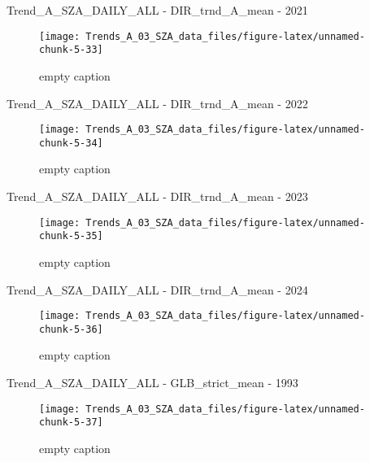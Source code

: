 \documentclass[
  10pt,
  a4paper,oneside]{article}
\begin{document}
Trend\_A\_SZA\_DAILY\_ALL - DIR\_trnd\_A\_mean - 2021

\begin{figure}[!ht]

{\centering \texttt{[image: Trends\_A\_03\_SZA\_data\_files/figure-latex/unnamed-chunk-5-33]} 

}

\caption{ empty caption }\label{fig:unnamed-chunk-5-33}
\end{figure}

Trend\_A\_SZA\_DAILY\_ALL - DIR\_trnd\_A\_mean - 2022

\begin{figure}[!ht]

{\centering \texttt{[image: Trends\_A\_03\_SZA\_data\_files/figure-latex/unnamed-chunk-5-34]} 

}

\caption{ empty caption }\label{fig:unnamed-chunk-5-34}
\end{figure}

Trend\_A\_SZA\_DAILY\_ALL - DIR\_trnd\_A\_mean - 2023

\begin{figure}[!ht]

{\centering \texttt{[image: Trends\_A\_03\_SZA\_data\_files/figure-latex/unnamed-chunk-5-35]} 

}

\caption{ empty caption }\label{fig:unnamed-chunk-5-35}
\end{figure}

Trend\_A\_SZA\_DAILY\_ALL - DIR\_trnd\_A\_mean - 2024

\begin{figure}[!ht]

{\centering \texttt{[image: Trends\_A\_03\_SZA\_data\_files/figure-latex/unnamed-chunk-5-36]} 

}

\caption{ empty caption }\label{fig:unnamed-chunk-5-36}
\end{figure}

Trend\_A\_SZA\_DAILY\_ALL - GLB\_strict\_mean - 1993

\begin{figure}[!ht]

{\centering \texttt{[image: Trends\_A\_03\_SZA\_data\_files/figure-latex/unnamed-chunk-5-37]} 

}

\caption{ empty caption }\label{fig:unnamed-chunk-5-37}
\end{figure}
\end{document}

